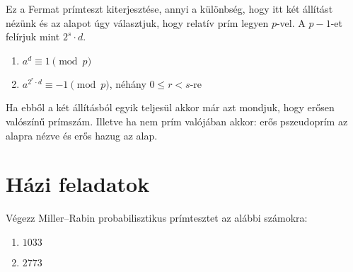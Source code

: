 Ez a Fermat prímteszt kiterjesztése, annyi a különbség, hogy itt két
állítást nézünk és az alapot úgy választjuk, hogy relatív prím legyen
$p$-vel. A $p-1$-et felírjuk mint $2^{s}\cdot d$. 
\begin{enumerate}
\item $a^{d}\equiv1\pmod p$ 
\item $a^{2^{r}\cdot d}\equiv-1\pmod p$, néhány $0\leq r<s$-re 
\end{enumerate}
Ha ebből a két állításból egyik teljesül akkor már azt mondjuk, hogy
erősen valószínű prímszám. Illetve ha nem prím valójában akkor: erős
pszeudoprím az alapra nézve és erős hazug az alap.

\section*{Házi feladatok}
\begin{problem}
Végezz Miller--Rabin probabilisztikus prímtesztet az alábbi számokra: 
\begin{enumerate}
\item $1033$ 
\item $2773$ 
\end{enumerate}
\end{problem}

